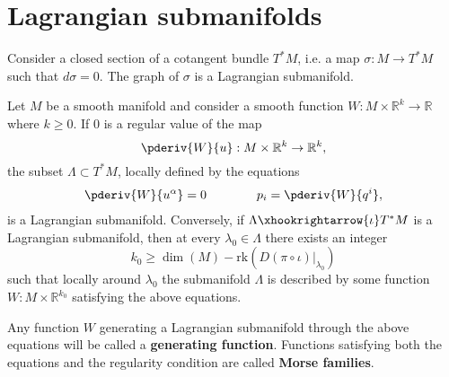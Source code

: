 \section{Lagrangian submanifolds}



    \begin{example}\label{symplectic:closed_section_submanifold}
        Consider a closed section of a cotangent bundle $T^*M$, i.e. a map $\sigma:M\rightarrow T^*M$ such that $d\sigma=0$. The graph of $\sigma$ is a Lagrangian submanifold.
    \end{example}

    \begin{theorem}
        Let $M$ be a smooth manifold and consider a smooth function $W:M\times\mathbb{R}^k\rightarrow\mathbb{R}$ where $k\geq 0$. If 0 is a regular value of the map \[\pderiv{W}{u}:M\times\mathbb{R}^k\rightarrow\mathbb{R}^k,\] the subset $\Lambda\subset T^*M$, locally defined by the equations
        \begin{gather}
            \pderiv{W}{u^\alpha} = 0\qquad\qquad p_i=\pderiv{W}{q^i},
        \end{gather}
        is a Lagrangian submanifold. Conversely, if $\Lambda\xhookrightarrow{\iota}T^*M$ is a Lagrangian submanifold, then at every $\lambda_0\in\Lambda$ there exists an integer \[k_0\geq\dim(M) - \text{rk}\left(D(\pi\circ\iota)|_{\lambda_0}\right)\] such that locally around $\lambda_0$ the submanifold $\Lambda$ is described by some function $W:M\times\mathbb{R}^{k_0}$ satisfying the above equations.
    \end{theorem}
    Any function $W$ generating a Lagrangian submanifold through the above equations will be called a \textbf{generating function}. Functions satisfying both the equations and the regularity condition are called \textbf{Morse families}.

